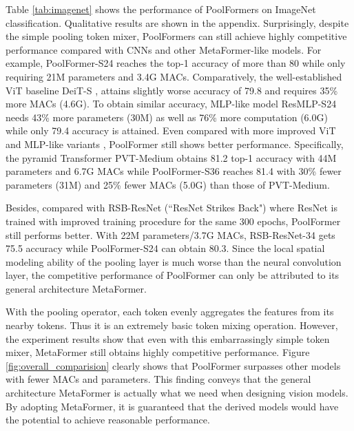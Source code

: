 Table \ref{tab:imagenet} shows the performance of PoolFormers on ImageNet classification. Qualitative results are shown in the appendix. Surprisingly, despite the simple pooling token mixer, PoolFormers can still achieve highly competitive performance compared with CNNs and other MetaFormer-like models. For example, PoolFormer-S24 reaches the top-1 accuracy of more than 80 while only requiring 21M parameters and 3.4G MACs. Comparatively, the well-established ViT baseline DeiT-S \cite{deit}, attains slightly worse accuracy of 79.8 and requires 35\% more MACs (4.6G). To obtain similar accuracy, MLP-like model ResMLP-S24 \cite{resmlp} needs 43\% more parameters (30M) as well as 76\% more computation (6.0G) while only 79.4 accuracy is attained. Even compared with more improved ViT and MLP-like variants \cite{pvt, gmlp}, PoolFormer still shows better performance. Specifically, the pyramid Transformer PVT-Medium obtains 81.2 top-1 accuracy with 44M parameters and 6.7G MACs while PoolFormer-S36 reaches 81.4 with 30\% fewer parameters (31M) and 25\% fewer MACs (5.0G) than those of PVT-Medium. 


Besides, compared with RSB-ResNet (``ResNet Strikes Back") \cite{resnet_improved} where ResNet \cite{resnet} is trained with improved training procedure for the same 300 epochs, PoolFormer still performs better. With  22M parameters/3.7G MACs, RSB-ResNet-34 \cite{resnet_improved} gets 75.5 accuracy while PoolFormer-S24 can obtain 80.3. Since the local spatial modeling ability of the pooling layer is much worse than the neural convolution layer, the competitive performance of PoolFormer can only be attributed to its general architecture MetaFormer.


With the pooling operator,  each token evenly aggregates the features from its nearby tokens. Thus it is an extremely basic token mixing operation. However, the experiment results show that even with this embarrassingly simple token mixer, MetaFormer still obtains highly competitive performance. 
Figure \ref{fig:overall_comparision} clearly shows that PoolFormer surpasses other models with fewer MACs and parameters. 
This finding conveys that the general architecture MetaFormer is actually what we need when designing vision models. By adopting MetaFormer, it is guaranteed that the derived models would have the potential to achieve reasonable performance. 

